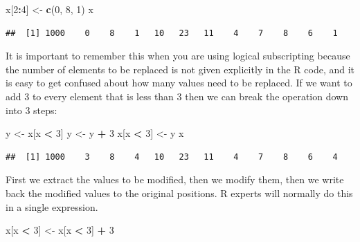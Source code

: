 \documentclass[
]{book}
\newenvironment{Shaded}{\begin{snugshade}}{\end{snugshade}}
\newcommand{\DecValTok}[1]{\textcolor[rgb]{0.00,0.00,0.81}{#1}}
\newcommand{\FunctionTok}[1]{\textcolor[rgb]{0.13,0.29,0.53}{\textbf{#1}}}
\newcommand{\NormalTok}[1]{#1}
\newcommand{\OtherTok}[1]{\textcolor[rgb]{0.56,0.35,0.01}{#1}}
\newcommand{\SpecialCharTok}[1]{\textcolor[rgb]{0.81,0.36,0.00}{\textbf{#1}}}
\theoremstyle{definition}
\theoremstyle{definition}
\theoremstyle{definition}
\theoremstyle{definition}
\theoremstyle{remark}
\begin{document}
\begin{Shaded}
\begin{Highlighting}[]
\NormalTok{x[}\DecValTok{2}\SpecialCharTok{:}\DecValTok{4}\NormalTok{] }\OtherTok{\textless{}{-}} \FunctionTok{c}\NormalTok{(}\DecValTok{0}\NormalTok{, }\DecValTok{8}\NormalTok{, }\DecValTok{1}\NormalTok{)}
\NormalTok{x}
\end{Highlighting}
\end{Shaded}

\begin{verbatim}
##  [1] 1000    0    8    1   10   23   11    4    7    8    6    1
\end{verbatim}

It is important to remember this when you are using logical
subscripting because the number of elements to be replaced is not
given explicitly in the R code, and it is easy to get confused about
how many values need to be replaced. If we want to add 3 to every
element that is less than 3 then we can break the operation down into
3 steps:

\begin{Shaded}
\begin{Highlighting}[]
\NormalTok{y }\OtherTok{\textless{}{-}}\NormalTok{ x[x }\SpecialCharTok{\textless{}} \DecValTok{3}\NormalTok{]}
\NormalTok{y }\OtherTok{\textless{}{-}}\NormalTok{ y }\SpecialCharTok{+} \DecValTok{3}
\NormalTok{x[x }\SpecialCharTok{\textless{}} \DecValTok{3}\NormalTok{] }\OtherTok{\textless{}{-}}\NormalTok{ y}
\NormalTok{x}
\end{Highlighting}
\end{Shaded}

\begin{verbatim}
##  [1] 1000    3    8    4   10   23   11    4    7    8    6    4
\end{verbatim}

First we extract the values to be modified, then we modify them, then we
write back the modified values to the original positions. R experts will
normally do this in a single expression.

\begin{Shaded}
\begin{Highlighting}[]
\NormalTok{x[x }\SpecialCharTok{\textless{}} \DecValTok{3}\NormalTok{] }\OtherTok{\textless{}{-}}\NormalTok{ x[x }\SpecialCharTok{\textless{}} \DecValTok{3}\NormalTok{] }\SpecialCharTok{+} \DecValTok{3}
\end{Highlighting}
\end{Shaded}
\end{document}
